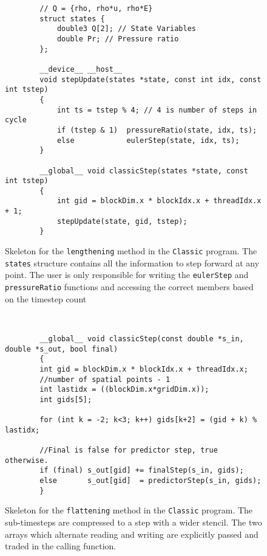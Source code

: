 \begin{figure}[bt]
    \begin{minipage}[t]{0.48\textwidth}
        \begin{lstlisting}
        // Q = {rho, rho*u, rho*E}
        struct states {
            double3 Q[2]; // State Variables
            double Pr; // Pressure ratio
        };

        __device__ __host__
        void stepUpdate(states *state, const int idx, const int tstep)
        {
            int ts = tstep % 4; // 4 is number of steps in cycle
            if (tstep & 1)  pressureRatio(state, idx, ts);
            else            eulerStep(state, idx, ts);
        }

        __global__ void classicStep(states *state, const int tstep)
        {
            int gid = blockDim.x * blockIdx.x + threadIdx.x + 1;
            stepUpdate(state, gid, tstep);
        }
        \end{lstlisting}
        \caption{Skeleton for the \texttt{lengthening} method in the \texttt{Classic} program. The \texttt{states} structure contains all the information to step forward at any point.  The user is only responsible for writing the \texttt{eulerStep} and \texttt{pressureRatio} functions and accessing the correct members based on the timestep count}
        \label{f:Longpseudo}
    \end{minipage}
    ~
    \begin{minipage}[t]{0.48\textwidth}
        \begin{lstlisting}
        __global__ void classicStep(const double *s_in, double *s_out, bool final)
        {
        int gid = blockDim.x * blockIdx.x + threadIdx.x;
        //number of spatial points - 1
        int lastidx = ((blockDim.x*gridDim.x));
        int gids[5];

        for (int k = -2; k<3; k++) gids[k+2] = (gid + k) % lastidx;

        //Final is false for predictor step, true otherwise.
        if (final) s_out[gid] += finalStep(s_in, gids);
        else       s_out[gid]  = predictorStep(s_in, gids);
        }
        \end{lstlisting}
        \caption{Skeleton for the \texttt{flattening} method in the \texttt{Classic} program. The sub-timesteps are compressed to a step with a wider stencil. The two arrays which alternate reading and writing are explicitly passed and traded in the calling function.}
        \label{f:flatPseudo}
    \end{minipage}
\end{figure}

